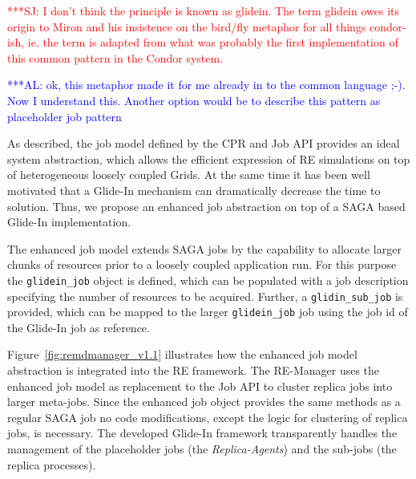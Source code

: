 \documentclass{rspublic}
\newcommand{\alnote}[1]{ {\textcolor{blue} { ***AL: #1 }}}
\newcommand{\jhanote}[1]{ {\textcolor{red} { ***SJ: #1 }}}
\newcommand{\alnote}[1]{}
\newcommand{\jhanote}[1]{}
\newcommand{\glidein}[1]{Glide-In }
\newcommand{\remanager}[1]{RE-Manager }
\begin{document}
\jhanote{I
don't think the principle is known as glidein. The term glidein owes
its origin to Miron and his insistence on the bird/fly metaphor for
all things condor-ish, ie. the term is adapted from what was
probably the first implementation of this common pattern in the
Condor system.}             

\alnote{ok, this metaphor made it for me already in to the common language 
;-). Now I understand this. Another option would 
be to describe this pattern as 
placeholder job pattern}

As described, the job model defined by the CPR and Job API provides an ideal 
system abstraction, which allows the efficient expression of RE simulations on
top of heterogeneous loosely coupled Grids. At the same time it has been well motivated
that a \glidein\ mechanism can dramatically decrease the time to solution. Thus, we
propose an enhanced job abstraction on top of a SAGA based \glidein\ implementation.

The enhanced job model extends SAGA jobs by the
capability to allocate larger chunks of resources prior to a loosely
coupled application run. For this purpose the \texttt{glidein\_job} object is defined, which
can be populated with a job description specifying the number of resources to be acquired.
Further, a \texttt{glidin\_sub\_job} is provided, which can be mapped
to the larger \texttt{glidein\_job} job using the job id of the \glidein\ job as reference.

Figure~\ref{fig:remdmanager_v1.1} illustrates how the enhanced job model abstraction is integrated
into the RE framework. The \remanager\  uses the enhanced job model as replacement to the Job API
to  cluster replica jobs into larger meta-jobs. Since the enhanced job object provides the same methods
as a regular SAGA job  no code modifications, except the logic for clustering of replica jobs, 
is necessary. The developed \glidein\ framework transparently handles the management of the placeholder jobs
(the \textit{Replica-Agents}) and the sub-jobs (the replica processes). 
\end{document}
